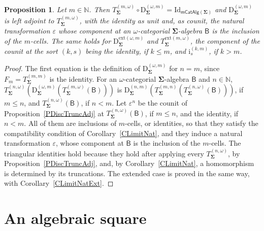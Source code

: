 \documentclass{amsart}
\theoremstyle{plain}
\newtheorem{proposition}[theorem]{Proposition}
\theoremstyle{definition}
\begin{document}
\begin{proposition}\label{POmegaDiscTrunc}
Let $m\in\mathbb{N}$. Then $T^{(m,\omega)}_{\mathbf{\Sigma}}\circ\mathrm{D}^{(\omega,m)}_{\mathbf{\Sigma}}=\mathrm{Id}_{\mathsf{mCatAlg}(\mathbf{\Sigma})}$ and $\mathrm{D}^{(\omega,m)}_{\mathbf{\Sigma}}$ is left adjoint to $T^{(m,\omega)}_{\mathbf{\Sigma}}$, with the identity as unit and, as counit, the natural transformation $\varepsilon$ whose component at an $\omega$-categorial $\mathbf{\Sigma}$-algebra $\boldsymbol{\mathsf{B}}$ is the inclusion of the $m$-cells. The same holds for $\mathrm{D}^{\mathrm{ext}(\omega,m)}_{\mathbf{\Sigma}}$ and $T^{\mathrm{ext}(m,\omega)}_{\mathbf{\Sigma}}$, the component of the counit at the sort $(k,s)$ being the identity, if $k\leq m$, and $\mathrm{i}^{(k,m)}_{s}$, if $k>m$.
\end{proposition}
\begin{proof}
The first equation is the definition of $\mathrm{D}^{(\omega,m)}_{\mathbf{\Sigma}}$ for $n=m$, since $F_{m}=T^{(m,m)}_{\mathbf{\Sigma}}$ is the identity. For an $\omega$-categorial $\mathbf{\Sigma}$-algebra $\boldsymbol{\mathsf{B}}$ and $n\in\mathbb{N}$, $T^{(n,\omega)}_{\mathbf{\Sigma}}(\mathrm{D}^{(\omega,m)}_{\mathbf{\Sigma}}(T^{(m,\omega)}_{\mathbf{\Sigma}}(\boldsymbol{\mathsf{B}})))$ is $\mathrm{D}^{(n,m)}_{\mathbf{\Sigma}}(T^{(m,n)}_{\mathbf{\Sigma}}(T^{(n,\omega)}_{\mathbf{\Sigma}}(\boldsymbol{\mathsf{B}})))$, if $m\leq n$, and $T^{(n,\omega)}_{\mathbf{\Sigma}}(\boldsymbol{\mathsf{B}})$, if $n<m$. Let $\varepsilon^{n}$ be the counit of Proposition~\ref{PDiscTruncAdj} at $T^{(n,\omega)}_{\mathbf{\Sigma}}(\boldsymbol{\mathsf{B}})$, if $m\leq n$, and the identity, if $n<m$. All of them are inclusions of $m$-cells, or identities, so that they satisfy the compatibility condition of Corollary~\ref{CLimitNat}, and they induce a natural transformation $\varepsilon$, whose component at $\boldsymbol{\mathsf{B}}$ is the inclusion of the $m$-cells. The triangular identities hold because they hold after applying every $T^{(n,\omega)}_{\mathbf{\Sigma}}$, by Proposition~\ref{PDiscTruncAdj}, and, by Corollary~\ref{CLimitNat}, a homomorphism is determined by its truncations. The extended case is proved in the same way, with Corollary~\ref{CLimitNatExt}.
\end{proof}


\section{An algebraic square}\label{SAlgSquare}
\end{document}
